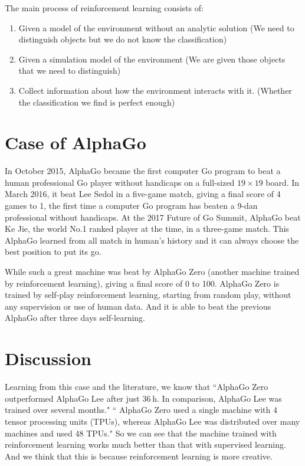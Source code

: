 \documentclass[a4paper,12pt]{article}
\begin{document}
The main process of reinforcement learning consists of:
\begin{enumerate}
\item Given a model of the environment without an analytic solution (We need to distinguish objects but we do not know the classification)
\item Given a simulation model of the environment (We are given those objects that we need to distinguish)
\item Collect information about how the environment interacts with it. (Whether the classification we find is perfect enough)
\end{enumerate}

\section{Case of AlphaGo}
In October 2015, AlphaGo became the first computer Go program to beat a human professional Go player without handicaps on a full-sized $19\times19$ board.\cite{alphago} In March 2016, it beat Lee Sedol in a five-game match, giving a final score of 4 games to 1, the first time a computer Go program has beaten a 9-dan professional without handicaps.\cite{match1} At the 2017 Future of Go Summit, AlphaGo beat Ke Jie, the world No.1 ranked player at the time, in a three-game match. This AlphaGo learned from all match in human's history and it can always choose the best position to put its go.

While such a great machine was beat by AlphaGo Zero (another machine trained by reinforcement learning), giving a final score of 0 to 100. AlphaGo Zero is trained by self-play reinforcement learning, starting from random play, without any supervision or use of human data. And it is able to beat the previous AlphaGo after three days self-learning.

\section{Discussion}
Learning from this case and the literature\cite{case}, we know that ``AlphaGo Zero outperformed AlphaGo Lee after just 36 h. In comparison, AlphaGo Lee was trained over several months." `` AlphaGo Zero used a single machine with 4 tensor processing units (TPUs), whereas AlphaGo Lee was distributed over many machines and used 48 TPUs." So we can see that the machine trained with reinforcement learning works much better than that with supervised learning. And we think that this is because reinforcement learning is more creative. 
\end{document}
